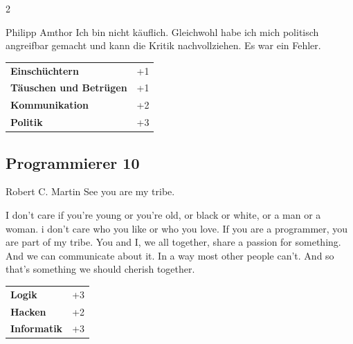 \begin{multicols}{2}
\begin{tcolorbox}
\begin{pquote}{Philipp Amthor}
Ich bin nicht käuflich. Gleichwohl habe ich mich politisch angreifbar gemacht und kann die Kritik nachvollziehen. Es war ein Fehler.
\end{pquote}

\vspace{3mm}

\begin{tabular}{@{}ll@{}}
    \textbf{Einschüchtern} & +1\\
    \textbf{Täuschen und Betrügen} & +1\\
    \textbf{Kommunikation} & +2\\
    \textbf{Politik} & +3\\
\end{tabular}


\end{tcolorbox}

\begin{tcolorbox}
    \subsection*{Programmierer \hfill \small{10 }}
    \tcblower


\begin{pquote}{Robert C. Martin}
See you are my tribe.

I don't care if you're young or you're old, or black or white, or a man or a woman. i don't care who you like or who you love. If you are a programmer, you are part of my tribe. You and I, we all together, share a passion for something. And we can communicate about it. In a way most other people can't. And so that's something we should cherish together.
\end{pquote}

\vspace{3mm}

\begin{tabular}{@{}ll@{}}
    \textbf{Logik} & +3\\
    \textbf{Hacken} & +2\\
    \textbf{Informatik} & +3\\
\end{tabular}


\end{tcolorbox}
\end{multicols}
